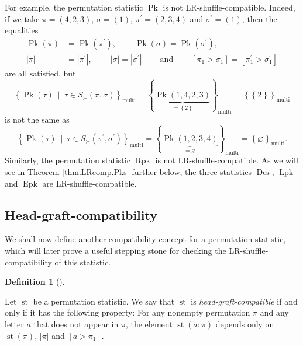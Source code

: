 \documentclass[numbers=enddot,12pt,final,onecolumn,notitlepage]{scrartcl}%
\theoremstyle{definition}
\newtheorem{defi}[theo]{Definition}
\newenvironment{definition}[1][]
{\begin{defi}[#1]\begin{leftbar}}
{\end{leftbar}\end{defi}}
\begin{document}
For example, the permutation statistic $\operatorname*{Pk}$ is not
LR-shuffle-compatible. Indeed, if we take $\pi=\left(  4,2,3\right)  $,
$\sigma=\left(  1\right)  $, $\pi^{\prime}=\left(  2,3,4\right)  $ and
$\sigma^{\prime}=\left(  1\right)  $, then the equalities%
\begin{align*}
\operatorname*{Pk}\left(  \pi\right)   &  =\operatorname*{Pk}\left(
\pi^{\prime}\right)  ,\ \ \ \ \ \ \ \ \ \ \operatorname*{Pk}\left(
\sigma\right)  =\operatorname*{Pk}\left(  \sigma^{\prime}\right)  ,\\
\left\vert \pi\right\vert  &  =\left\vert \pi^{\prime}\right\vert
,\ \ \ \ \ \ \ \ \ \ \left\vert \sigma\right\vert =\left\vert \sigma^{\prime
}\right\vert \ \ \ \ \ \ \ \ \ \ \text{and}\ \ \ \ \ \ \ \ \ \ \left[  \pi
_{1}>\sigma_{1}\right]  =\left[  \pi_{1}^{\prime}>\sigma_{1}^{\prime}\right]
\end{align*}
are all satisfied, but%
\[
\left\{  \operatorname*{Pk}\left(  \tau\right)  \ \mid\ \tau\in S_{\succ
}\left(  \pi,\sigma\right)  \right\}  _{\operatorname*{multi}}=\left\{
\underbrace{\operatorname*{Pk}\left(  1,4,2,3\right)  }_{=\left\{  2\right\}
}\right\}  _{\operatorname*{multi}}=\left\{  \left\{  2\right\}  \right\}
_{\operatorname*{multi}}%
\]
is not the same as%
\[
\left\{  \operatorname*{Pk}\left(  \tau\right)  \ \mid\ \tau\in S_{\succ
}\left(  \pi^{\prime},\sigma^{\prime}\right)  \right\}
_{\operatorname*{multi}}=\left\{  \underbrace{\operatorname*{Pk}\left(
1,2,3,4\right)  }_{=\varnothing}\right\}  _{\operatorname*{multi}}=\left\{
\varnothing\right\}  _{\operatorname*{multi}}.
\]
Similarly, the permutation statistic $\operatorname*{Rpk}$ is not
LR-shuffle-compatible. As we will see in Theorem \ref{thm.LRcomp.Pks} further
below, the three statistics $\operatorname*{Des}$, $\operatorname*{Lpk}$ and
$\operatorname*{Epk}$ are LR-shuffle-compatible.

\subsection{Head-graft-compatibility}

We shall now define another compatibility concept for a permutation statistic,
which will later prove a useful stepping stone for checking the
LR-shuffle-compatibility of this statistic.

\begin{definition}
\label{def.head-comp}Let $\operatorname*{st}$ be a permutation statistic. We
say that $\operatorname*{st}$ is \textit{head-graft-compatible} if and only if
it has the following property: For any nonempty permutation $\pi$ and any
letter $a$ that does not appear in $\pi$, the element $\operatorname*{st}%
\left(  a:\pi\right)  $ depends only on $\operatorname*{st}\left(  \pi\right)
$, $\left\vert \pi\right\vert $ and $\left[  a>\pi_{1}\right]  $.
\end{definition}
\end{document}
